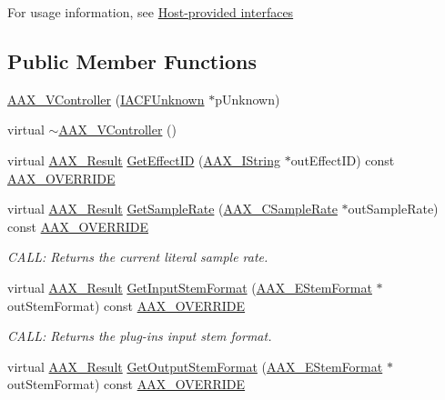 For usage information, see \hyperlink{a00357_using_acf_host_provided_interfaces}{Host-\/provided interfaces} \subsection*{Public Member Functions}
\begin{DoxyCompactItemize}
\item 
\hyperlink{a00132_ae2076dd569e3ae5e2bdc3934e3392493}{A\+A\+X\+\_\+\+V\+Controller} (\hyperlink{a00146}{I\+A\+C\+F\+Unknown} $\ast$p\+Unknown)
\item 
virtual \hyperlink{a00132_ac0fca345a618eafcd820ca1a41428bc4}{$\sim$\+A\+A\+X\+\_\+\+V\+Controller} ()
\item 
virtual \hyperlink{a00149_a4d8f69a697df7f70c3a8e9b8ee130d2f}{A\+A\+X\+\_\+\+Result} \hyperlink{a00132_a1cafe447b49c14226b864be868b09593}{Get\+Effect\+I\+D} (\hyperlink{a00113}{A\+A\+X\+\_\+\+I\+String} $\ast$out\+Effect\+I\+D) const \hyperlink{a00149_ac2f24a5172689ae684344abdcce55463}{A\+A\+X\+\_\+\+O\+V\+E\+R\+R\+I\+D\+E}
\item 
virtual \hyperlink{a00149_a4d8f69a697df7f70c3a8e9b8ee130d2f}{A\+A\+X\+\_\+\+Result} \hyperlink{a00132_a2493486f1cbdc2106452a12679ac444c}{Get\+Sample\+Rate} (\hyperlink{a00149_a3d9eea08f47e0b0a23432e15baa4e885}{A\+A\+X\+\_\+\+C\+Sample\+Rate} $\ast$out\+Sample\+Rate) const \hyperlink{a00149_ac2f24a5172689ae684344abdcce55463}{A\+A\+X\+\_\+\+O\+V\+E\+R\+R\+I\+D\+E}
\begin{DoxyCompactList}\small\item\em C\+A\+L\+L\+: Returns the current literal sample rate. \end{DoxyCompactList}\item 
virtual \hyperlink{a00149_a4d8f69a697df7f70c3a8e9b8ee130d2f}{A\+A\+X\+\_\+\+Result} \hyperlink{a00132_a71f984c9e21f7b59ad216b1a05c9f9e6}{Get\+Input\+Stem\+Format} (\hyperlink{a00206_ad8af5ef008b2bd478add9a0acb0a1d85}{A\+A\+X\+\_\+\+E\+Stem\+Format} $\ast$out\+Stem\+Format) const \hyperlink{a00149_ac2f24a5172689ae684344abdcce55463}{A\+A\+X\+\_\+\+O\+V\+E\+R\+R\+I\+D\+E}
\begin{DoxyCompactList}\small\item\em C\+A\+L\+L\+: Returns the plug-\/in\textquotesingle{}s input stem format. \end{DoxyCompactList}\item 
virtual \hyperlink{a00149_a4d8f69a697df7f70c3a8e9b8ee130d2f}{A\+A\+X\+\_\+\+Result} \hyperlink{a00132_a19125ceede40bc9ab7a1d9f9fe073bf6}{Get\+Output\+Stem\+Format} (\hyperlink{a00206_ad8af5ef008b2bd478add9a0acb0a1d85}{A\+A\+X\+\_\+\+E\+Stem\+Format} $\ast$out\+Stem\+Format) const \hyperlink{a00149_ac2f24a5172689ae684344abdcce55463}{A\+A\+X\+\_\+\+O\+V\+E\+R\+R\+I\+D\+E}

\end{DoxyCompactItemize}

